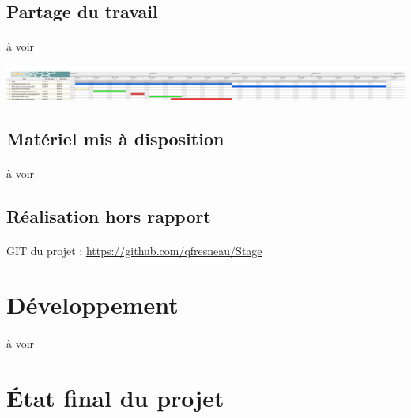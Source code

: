\documentclass[a4paper,12pt]{extarticle}
\begin{document}
\subsection{Partage du travail}

\paragraph{}
à voir\\

\centerline{\includegraphics[scale=0.18]{DiagrammeDeGantt}}

\subsection{Matériel mis à disposition}

\paragraph{}
à voir\\

\subsection{Réalisation hors rapport}

\paragraph{}
GIT du projet :
\url{https://github.com/qfresneau/Stage}\\

\clearpage

\section{Développement}

\paragraph{}
à voir\\

\clearpage

\section{État final du projet}
\end{document}

